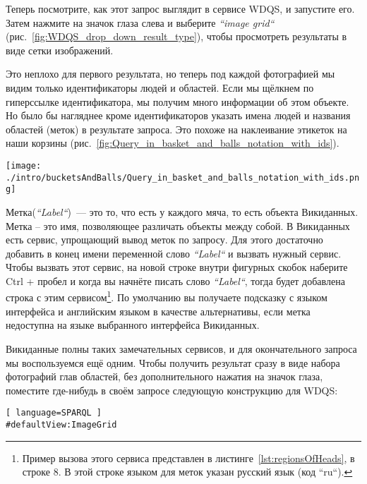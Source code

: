 \newpage Теперь посмотрите, как этот запрос выглядит в сервисе WDQS, и запустите его. Затем нажмите на значок глаза слева и выберите \textit{``image grid``} (рис.~\ref{fig:WDQS_drop_down_result_type}), чтобы просмотреть результаты в виде сетки изображений.

\begin{marginfigure}
	{
		\setlength{\fboxsep}{0pt}%
		\setlength{\fboxrule}{1pt}%
	}
    \caption{Выбор отображения результатов в виде \textit{``image grid``} (сетки изображений).}
	\label{fig:WDQS_drop_down_result_type}
\end{marginfigure}

Это неплохо для первого результата, но теперь под каждой фотографией мы видим только идентификаторы людей и областей. Если мы щёлкнем по гиперссылке идентификатора, мы получим много информации об этом объекте. Но было бы нагляднее кроме идентификаторов указать имена людей и названия областей (меток) в результате запроса. Это похоже на наклеивание этикеток на наши корзины (рис.~\ref{fig:Query_in_basket_and_balls_notation_with_ids}).

\begin{figure*}[h!]
\texttt{[image: ./intro/bucketsAndBalls/Query\_in\_basket\_and\_balls\_notation\_with\_ids.png]}
\caption{Запрос в нотации <<Корзины и мячи>> с номерами свойств и объектов Викиданных.}
\label{fig:Query_in_basket_and_balls_notation_with_ids}
\end{figure*}

Метка(\textit{``Label``})~--- это то, что есть у каждого мяча, то есть объекта Викиданных. Метка – это имя, позволяющее различать объекты между собой. В Викиданных есть сервис, упрощающий вывод меток по запросу. Для этого достаточно добавить в конец имени переменной слово \textit{``Label``} и вызвать нужный сервис. Чтобы вызвать этот сервис, на новой строке внутри фигурных скобок наберите Ctrl + пробел и когда вы начнёте писать слово \textit{``Label``}, тогда будет добавлена строка с этим сервисом\footnote[][12pt]{Пример вызова этого сервиса представлен в листинге~\ref{lst:regionsOfHeads}, в строке 8. В этой строке языком для меток указан русский язык (код ``ru``).}. По умолчанию вы получаете подсказку с языком интерфейса и английским языком в качестве альтернативы, если метка недоступна на языке выбранного интерфейса Викиданных.

Викиданные полны таких замечательных сервисов, и для окончательного запроса мы воспользуемся ещё одним. Чтобы получить результат сразу в виде набора фотографий глав областей, без дополнительного нажатия на значок глаза, поместите где-нибудь в своём запросе следующую конструкцию для WDQS:
\begin{lstlisting}[ language=SPARQL ]
#defaultView:ImageGrid
\end{lstlisting}

